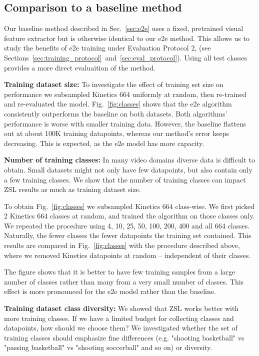 \documentclass[10pt,twocolumn,letterpaper]{article}
\begin{document}
\subsection{Comparison to a baseline method}
\label{sec:comparebaseline}
Our baseline method described in Sec.~\ref{sec:e2e} uses a fixed, pretrained visual feature extractor but is otherwise identical to our e2e method. This allows us to study the benefits of e2e training under Evaluation Protocol 2, (see Sections~\ref{sec:training_protocol}~and~\ref{sec:eval_protocol}). Using all test classes provides a more direct evaluaition of the method.


\textbf{Training dataset size:}
To investigate the effect of training set size on performance we subsampled Kinetics 664 uniformly at random, then re-trained and re-evaluated the model. Fig.~\ref{fig:classes} shows that the e2e algorithm consistently outperforms the baseline on both datasets. Both algorithms' performance is worse with smaller training data. However, the baseline flattens out at about 100K training datapoints, whereas our method's error keeps decreasing. This is expected, as the e2e model has more capacity.

\textbf{Number of training classes:}
In many video domains diverse data is difficult to obtain. Small datasets might not only have few datapoints, but also contain only a few training classes. We show that the number of training classes can impact ZSL results as much as training dataset size.

To obtain Fig.~\ref{fig:classes} we subsampled Kinetics 664 class-wise. We first picked 2 Kinetics 664 classes at random, and trained the algorithm on those classes only. We repeated the procedure using 4, 10, 25, 50, 100, 200, 400 and all 664 classes. Naturally, the fewer classes the fewer datapoints the training set contained. This results are compared in Fig.~\ref{fig:classes} with the procedure described above, where we removed Kinetics datapoints at random -- independent of their classes. 

The figure shows that it is better to have few training samples from a large number of classes rather than many from a very small number of classes.
This effect is more pronounced for the e2e model rather than the baseline.

\textbf{Training dataset class diversity:}
We showed that ZSL works better with more training classes. If we have a limited budget for collecting classes and datapoints, how should we choose them? We investigated whether the set of training classes should emphasize fine differences (e.g. "shooting basketball" vs "passing basketball" vs "shooting soccerball" and so on) or diversity. 
\end{document}
